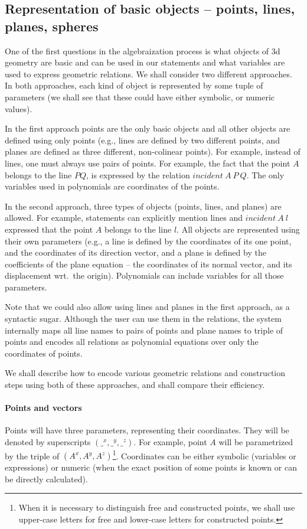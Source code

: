 \documentclass[final,1p,times,authoryear]{elsarticle}
\begin{document}
\subsection{Representation of basic objects -- points, lines, planes, spheres}
One of the first questions in the algebraization process is what
objects of 3d geometry are basic and can be used in our statements and
what variables are used to express geometric relations. We shall
consider two different approaches. In both approaches, each kind of
object is represented by some tuple of parameters (we shall see that
these could have either symbolic, or numeric values).

In the first approach points are the only basic objects and all other
objects are defined using only points (e.g., lines are defined by two
different points, and planes are defined as three different,
non-colinear points). For example, instead of lines, one must always
use pairs of points. For example, the fact that the point $A$ belongs
to the line $PQ$, is expressed by the relation $incident\ A\ P\ Q$.
The only variables used in polynomials are coordinates of the points.

In the second approach, three types of objects (points, lines, and
planes) are allowed. For example, statements can explicitly mention
lines and $incident\ A\ l$ expressed that the point $A$ belongs to the
line $l$. All objects are represented using their own parameters
(e.g., a line is defined by the coordinates of its one point, and the
coordinates of its direction vector, and a plane is defined by the
coefficients of the plane equation -- the coordinates of its normal
vector, and its displacement wrt.~the origin). Polynomials can include
variables for all those parameters.

Note that we could also allow using lines and planes in the first
approach, as a syntactic sugar. Although the user can use them in the
relations, the system internally maps all line names to pairs of
points and plane names to triple of points and encodes all relations
as polynomial equations over only the coordinates of points.

We shall describe how to encode various geometric relations and
construction steps using both of these approaches, and shall compare
their efficiency.

\paragraph{Points and vectors}
Points will have three parameters, representing their
coordinates. They will be denoted by superscripts
$({\_}^x, {\_}^y, {\_}^z)$. For example, point $A$ will be
parametrized by the triple of $(A^x, A^y, A^z)$\footnote{When it is
  necessary to distinguish free and constructed points, we shall use
  upper-case letters for free and lower-case letters for constructed
  points.}. Coordinates can be either symbolic (variables or
expressions) or numeric (when the exact position of some points is
known or can be directly calculated).
\end{document}
